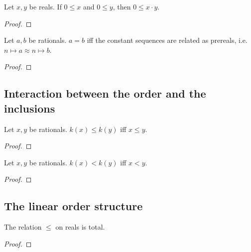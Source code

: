 \begin{lemma}
    \leanok
    Let $x,y$ be reals.
    If $0 \leq x$ and $0 \leq y$, then $0 \leq x \cdot y$.
\end{lemma}
\begin{proof}
    \leanok
\end{proof}

\begin{lemma}
    \leanok
    Let $a,b$ be rationals.
    $a = b$ iff the constant sequences are related as prereals, i.e. $n \mapsto a \approx n \mapsto b$.
\end{lemma}
\begin{proof}
    \leanok
\end{proof}

\subsection{Interaction between the order and the inclusions}

\begin{lemma}
    \leanok
    Let $x,y$ be rationals.
    $k(x) \leq k(y)$ iff $x \leq y$.
\end{lemma}
\begin{proof}
    \leanok
\end{proof}

\begin{lemma}
    \leanok
    Let $x,y$ be rationals.
    $k(x) < k(y)$ iff $x < y$.
\end{lemma}
\begin{proof}
    \leanok
\end{proof}

\subsection{The linear order structure}

\begin{lemma}
    \leanok
    The relation $\leq$ on reals is total.
\end{lemma}
\begin{proof}
    \leanok
\end{proof}

